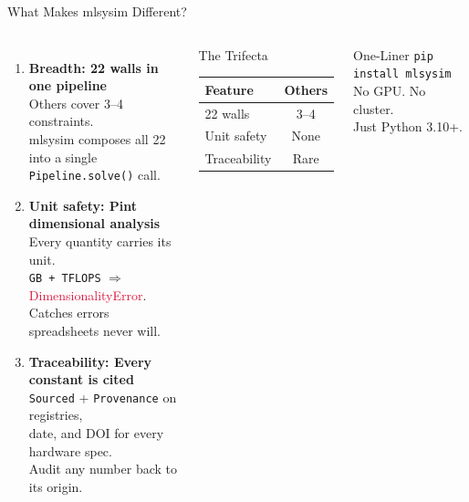 \begin{frame}{What Makes mlsysim Different?}
\begin{columns}[T]
\begin{enumerate}
  \item \textbf{Breadth: 22 walls in one pipeline}\\
    \small Others cover 3--4 constraints.\\
    mlsysim composes all 22 into a single\\
    \texttt{Pipeline.solve()} call.

  \vspace{0.6em}
  \item \textbf{Unit safety: Pint dimensional analysis}\\
    \small Every quantity carries its unit.\\
    \texttt{GB + TFLOPS} $\Rightarrow$ \textcolor{crimson}{DimensionalityError}.\\
    Catches errors spreadsheets never will.

  \vspace{0.6em}
  \item \textbf{Traceability: Every constant is cited}\\
    \small \texttt{Sourced} + \texttt{Provenance} on registries,\\
    date, and DOI for every hardware spec.\\
    Audit any number back to its origin.
\end{enumerate}

\centering
\begin{block}{The Trifecta}
\small
\begin{tabular}{@{}lc@{}}
Feature & Others \\
\midrule
22 walls     & 3--4 \\
Unit safety  & None \\
Traceability & Rare \\
\end{tabular}
\end{block}

\vspace{1em}
\begin{exampleblock}{One-Liner}
\footnotesize
\texttt{pip install mlsysim}\\[2pt]
No GPU. No cluster.\\
Just Python 3.10+.
\end{exampleblock}
\end{columns}
\end{frame}


